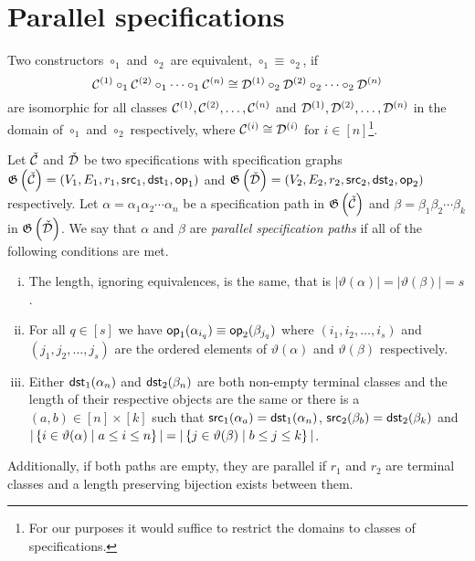 \section{Parallel specifications}
\begin{definition}
Two constructors $\circ_1$ and $\circ_2$ are equivalent, $\circ_1 \equiv \circ_2$, if
\[
    \mathcal{C}^{\left(1\right)} \circ_1 \mathcal{C}^{\left(2\right)} \circ_1 \dotsm \circ_1 \mathcal{C}^{\left(n\right)} \cong \mathcal{D}^{\left(1\right)} \circ_2 \mathcal{D}^{\left(2\right)} \circ_2 \dotsm \circ_2 \mathcal{D}^{\left(n\right)}
\]
are isomorphic for all classes $\mathcal{C}^{\left(1\right)},\mathcal{C}^{\left(2\right)},\dotsc,\mathcal{C}^{\left(n\right)}$ and $\mathcal{D}^{\left(1\right)},\mathcal{D}^{\left(2\right)},\dotsc,\mathcal{D}^{\left(n\right)}$ in the domain of $\circ_1$ and $\circ_2$ respectively, where $\mathcal{C}^{\left(i\right)}\cong\mathcal{D}^{\left(i\right)}$ for $i \in [n]$\footnote{For our purposes it would suffice to restrict the domains to classes of specifications.}.
\end{definition}
\begin{definition}
Let $\check{\mathcal{C}}$ and $\check{\mathcal{D}}$ be two specifications with specification graphs $\mathfrak{G}\left(\check{\mathcal{C}}\right)=(V_1,E_1,r_1,\textsf{src}_1,\textsf{dst}_1,\textsf{op}_1)$ and $\mathfrak{G}\left(\check{\mathcal{D}}\right) = (V_2,E_2,r_2,\textsf{src}_2,\textsf{dst}_2,\textsf{op}_2)$ respectively. Let $\alpha=\alpha_1\alpha_2 \dotsm \alpha_n$ be a specification path in $\mathfrak{G}\left(\check{\mathcal{C}}\right)$ and $\beta=\beta_1\beta_2 \dotsm \beta_k$ in $\mathfrak{G}\left(\check{\mathcal{D}}\right)$. We say that $\alpha$ and $\beta$ are \emph{parallel specification paths} if all of the following conditions are met.
\begin{enumerate}[i.]
    \item The length, ignoring equivalences, is the same, that is $|\vartheta(\alpha)| = |\vartheta(\beta)| = s$.
    \item For all $q\in[s]$ we have $\textsf{op}_1(\alpha_{i_q}) \equiv \textsf{op}_2(\beta_{j_q})$ where $(i_1,i_2,\dotsc,i_s)$ and $(j_1,j_2,\dotsc,j_s)$ are the ordered elements of $\vartheta(\alpha)$ and $\vartheta(\beta)$ respectively.
    \item Either $\textsf{dst}_1(\alpha_n)$ and $\textsf{dst}_2(\beta_n)$ are both non-empty terminal classes and the length of their respective objects are the same or there is a $(a,b) \in [n] \times [k]$ such that $\textsf{src}_1(\alpha_a) = \textsf{dst}_1(\alpha_n)$, $\textsf{src}_2(\beta_b) = \textsf{dst}_2(\beta_k)$ and $|\left\{i \in \vartheta(\alpha) \mid a \leq i \leq n\right\}| = |\left\{j \in \vartheta(\beta) \mid b \leq j \leq k\right\}|$.
\end{enumerate}
Additionally, if both paths are empty, they are parallel if $r_1$ and $r_2$ are terminal classes and a length preserving bijection exists between them.
\end{definition}
